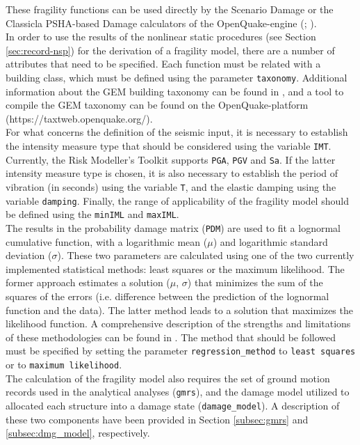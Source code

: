These fragility functions can be used directly by the Scenario Damage or the Classicla PSHA-based Damage calculators of the OpenQuake-engine (\cite{SilvaEtAl2014a}; \cite{PaganiEtAl2014a}). \\

In order to use the results of the nonlinear static procedures (see Section \ref{sec:record-nsp}) for the derivation of a fragility model, there are a number of attributes that need to be specified. Each function must be related with a building class, which must be defined using the parameter \verb=taxonomy=. Additional information about the GEM building taxonomy can be found in \cite{BrzevEtAl2013}, and a tool to compile the GEM taxonomy can be found on the OpenQuake-platform (https://taxtweb.openquake.org/).\\

For what concerns the definition of the seismic input, it is necessary to establish the intensity measure type that should be considered using the variable \verb=IMT=. Currently, the Risk Modeller's Toolkit supports \verb=PGA=, \verb=PGV= and \verb=Sa=. If the latter intensity measure type is chosen, it is also necessary to establish the period of vibration (in seconds) using the variable \verb=T=, and the elastic damping using the variable \verb=damping=. Finally, the range of applicability of the fragility model should be defined using the \verb=minIML= and \verb=maxIML=.  \\

The results in the probability damage matrix (\verb=PDM=) are used to fit a lognormal cumulative function, with a logarithmic mean ($\mu$) and logarithmic standard deviation ($\sigma$). These two parameters are calculated using one of the two currently implemented statistical methods: least squares or the maximum likelihood. The former approach estimates a solution ($\mu$, $\sigma$) that minimizes the sum of the squares of the errors (i.e. difference between the prediction of the lognormal function and the data). The latter method leads to a solution that maximizes the likelihood function. A comprehensive description of the strengths and limitations of these methodologies can be found in \cite{LallemantEtAl2015}. The method that should be followed must be specified by setting the parameter \verb=regression_method= to \verb=least squares= or to \verb=maximum likelihood=.\\

The calculation of the fragility model also requires the set of ground motion records used in the analytical analyses (\verb=gmrs=), and the damage model utilized to allocated each structure into a damage state (\verb=damage_model=). A description of these two components have been provided in Section \ref{subsec:gmrs} and \ref{subsec:dmg_model}, respectively.\\

